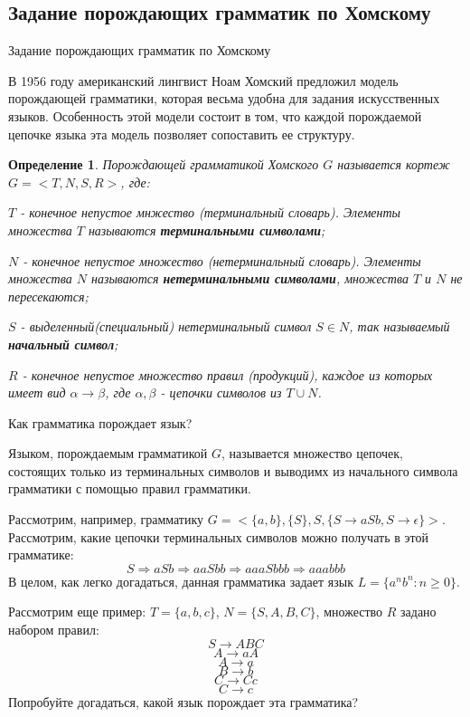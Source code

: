 \documentclass[12pt, pdf, hyperref={unicode},handout]{beamer}
\newtheorem{dfn}{Определение}
\begin{document}
\subsection{Задание порождающих грамматик по Хомскому}
\begin{frame}{Задание порождающих грамматик по Хомскому}
  \begin{block}

    \small{
      В 1956 году американский лингвист Ноам Хомский предложил модель порождающей грамматики, которая весьма удобна для задания искусственных языков. Особенность этой модели состоит в том, что каждой порождаемой цепочке языка эта модель позволяет сопоставить ее структуру.

      \begin{dfn}
        Порождающей грамматикой Хомского $G$ называется кортеж $G=<T,N,S,R>$, где:

        $T$ - конечное непустое мнжество (терминальный словарь). Элементы множества $T$ называются \textbf{терминальными символами};

        $N$ - конечное непустое множество (нетерминальный словарь). Элементы множества $N$ называются \textbf{нетерминальными символами}, множества $T$ и $N$ не пересекаются;

        $S$ - выделенный(специальный) нетерминальный символ $S\in N$, так называемый \textbf{начальный символ};

        $R$ - конечное непустое множество правил (продукций), каждое из которых имеет вид $\alpha\rightarrow \beta$, где $\alpha, \beta$  - цепочки символов из $T\cup N$.
        \end{dfn}
      }

  \end{block}
  
\end{frame}

\begin{frame}{Как грамматика порождает язык?}
  \begin{block}

    \small{
      Языком, порождаемым грамматикой $G$, называется множество цепочек, состоящих только из терминальных символов и выводимх из начального символа грамматики с помощью правил грамматики.

      Рассмотрим, например, грамматику $G=<\{a,b\},\{S\}, S, \{S\rightarrow aSb, S\rightarrow\epsilon\}>$.
      Рассмотрим, какие цепочки терминальных символов можно получать в этой грамматике:
      $$S\Rightarrow aSb\Rightarrow aaSbb\Rightarrow aaaSbbb\Rightarrow aaabbb$$
      В целом, как легко догадаться, данная грамматика задает язык $L=\{a^nb^n: n\geq 0\}$.

      Рассмотрим еще пример: $T=\{a,b,c\}$, $N=\{S,A,B,C\}$, множество $R$ задано набором правил:
      $$S\rightarrow ABC$$
      $$A\rightarrow aA$$
      $$A\rightarrow a$$
      $$B\rightarrow b$$
      $$C\rightarrow Cc$$
      $$C\rightarrow c$$
Попробуйте догадаться, какой язык порождает эта грамматика?
      }

  \end{block}
  
\end{frame}
\end{document}
